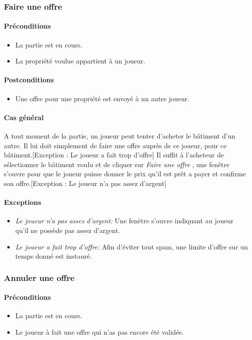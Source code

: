 \documentclass[a4paper,11pt]{report}
\begin{document}
\subsubsection{Faire une offre}
\paragraph{Préconditions}
\begin{itemize}
 \item La partie est en cours.
 \item La propriété voulue appartient à un joueur.
\end{itemize}
\paragraph{Postconditions}
\begin{itemize}
 \item Une offre pour une propriété est envoyé à un autre joueur.
\end{itemize}
\paragraph{Cas général}
A tout moment de la partie, un joueur peut tenter d'acheter le bâtiment d'un autre. Il lui doit simplement de faire une offre auprès de ce joueur, pour ce bâtiment.[Exception : Le joueur a fait trop d'offre] Il suffit à l'acheteur de sélectionner le bâtiment voulu et de cliquer sur \og \textit{Faire une offre} \fg, une fenêtre s'ouvre pour que le joueur puisse donner le prix qu'il est prêt a payer et confirme son offre.[Exception : Le joueur n'a pas assez d'argent] 
\paragraph{Exceptions}
\begin{itemize}
 \item \textit{Le joueur n'a pas assez d'argent:} Une fenètre s'ouvre indiquant au joueur qu'il ne possède pas assez d'argent.
 \item \textit{Le joueur a fait trop d'offre:} Afin d'éviter tout spam, une limite d'offre sur un temps donné est instauré.
\end{itemize}
\subsubsection{Annuler une offre}
\paragraph{Préconditions}
\begin{itemize}
 \item La partie est en cours.
 \item Le joueur à fait une offre qui n'as pas encore été validée.
\end{itemize}
\end{document}
